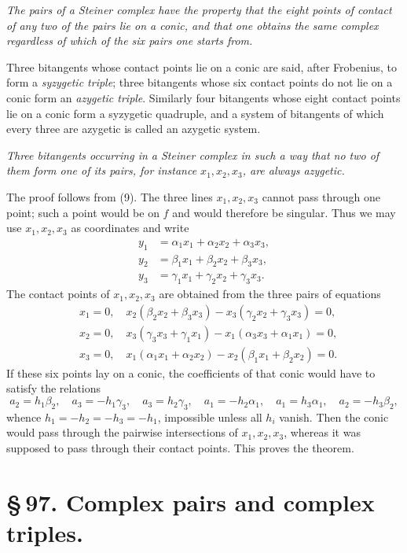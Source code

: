 \documentclass[11pt]{article}
\begin{document}
\emph{The pairs of a Steiner complex have the property that the eight points of contact of any two of the pairs lie on a conic, and that one obtains the same complex regardless of which of the six pairs one starts from.}

Three bitangents whose contact points lie on a conic are said, after Frobenius, to form a \emph{syzygetic triple}; three bitangents whose six contact points do not lie on a conic form an \emph{azygetic triple}. Similarly four bitangents whose eight contact points lie on a conic form a syzygetic quadruple, and a system of bitangents of which every three are azygetic is called an azygetic system.

\emph{Three bitangents occurring in a Steiner complex in such a way that no two of them form one of its pairs, for instance \(x_1,x_2,x_3\), are always azygetic.}

The proof follows from (9). The three lines \(x_1,x_2,x_3\) cannot pass through one point; such a point would be on \(f\) and would therefore be singular. Thus we may use \(x_1,x_2,x_3\) as coordinates and write
\begin{align*}
 y_1&=\alpha_1x_1+\alpha_2x_2+\alpha_3x_3,\\
 y_2&=\beta_1x_1+\beta_2x_2+\beta_3x_3,\\
 y_3&=\gamma_1x_1+\gamma_2x_2+\gamma_3x_3.
\end{align*}
The contact points of \(x_1,x_2,x_3\) are obtained from the three pairs of equations
\begin{align*}
&x_1=0,\quad x_2(\beta_2x_2+\beta_3x_3)-x_3(\gamma_2x_2+\gamma_3x_3)=0,\\
&x_2=0,\quad x_3(\gamma_3x_3+\gamma_1x_1)-x_1(\alpha_3x_3+\alpha_1x_1)=0,\\
&x_3=0,\quad x_1(\alpha_1x_1+\alpha_2x_2)-x_2(\beta_1x_1+\beta_2x_2)=0.
\end{align*}
If these six points lay on a conic, the coefficients of that conic would have to satisfy the relations
\begin{equation}
 a_2=h_1\beta_2,
\quad a_3=-h_1\gamma_3,
\quad a_3=h_2\gamma_3,
\quad a_1=-h_2\alpha_1,
\quad a_1=h_3\alpha_1,
\quad a_2=-h_3\beta_2,
 \tag{10}
\end{equation}
whence \(h_1=-h_2=-h_3=-h_1\), impossible unless all \(h_i\) vanish. Then the conic would pass through the pairwise intersections of \(x_1,x_2,x_3\), whereas it was supposed to pass through their contact points. This proves the theorem.

\clearpage
\section*{\S\,97. Complex pairs and complex triples.}
\end{document}
